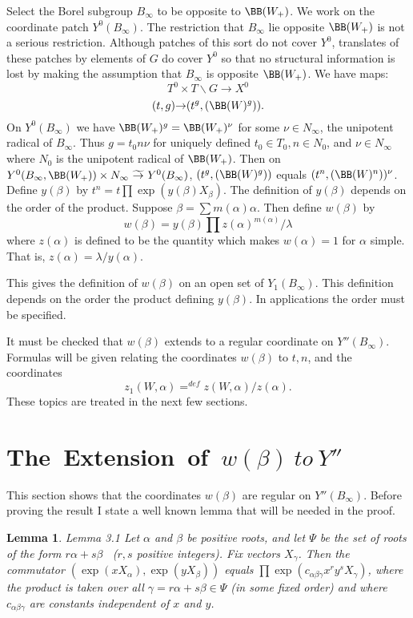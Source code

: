 \documentclass{memo-l}
\newtheorem{lemma}[theorem]{Lemma}
\theoremstyle{definition}
\theoremstyle{remark}
\numberwithin{section}{chapter}
\numberwithin{equation}{chapter}
\begin{document}
   Select the Borel subgroup $B_{{\infty}}$ to be opposite to
${\BB}(W_{+})$.
 We work on the coordinate patch $Y^{0}(B_{{\infty}})$.
 The restriction that $B_{{\infty}}$ lie opposite ${\BB}(W_{+})$ is not a
serious restriction.
 Although patches of this sort do not cover $Y^{0}$, translates of these
patches by elements of $G$ do cover $Y^{0}$ so that no structural information
is lost by making the assumption that $B_{{\infty}}$ is opposite
${\BB}(W_{+})$.
 We have maps:
$$
T^{0} \times T\backslash G {\to} X^{0}
$$
$$
(t,g) {\to} (t^{g},({\BB}(W)^{g})) .
$$
On $Y^{0}(B_{{\infty}})$ we have ${\BB}(W_{+})^{g} =
{\BB}(W_{+})^{{\nu}}$ for some ${\nu} \in N_{{\infty}}$, the unipotent
radical of $B_{{\infty}}$.
 Thus $g=t_{0}n{\nu}$ for uniquely defined $t_{0} \in T_{0}, n \in N_{0}$,
and ${\nu} \in N_{{\infty}}$ where $N_{0}$ is the unipotent radical of
${\BB}(W_{+})$.
 Then on $Y^{0}(B_{{\infty}},{\BB}(W_{+})) \times N_{{\infty}}\
{\widetilde{\to}}\  Y^{0}(B_{{\infty}})$, $(t^{g},({\BB}(W)^{g}))$ equals
$(t^{n},({\BB}(W)^{n}))^{{\nu}}$.
 Define $y({\beta})$ by $t^{n} = t \prod \exp(y({\beta})X_{{\beta}})$.
 The definition of $y({\beta})$ depends on the order of the product.
 Suppose ${\beta} = \sum m({\alpha}){\alpha}$.
 Then define $w({\beta})$ by
$$
w({\beta}) = y({\beta})
\prod z({\alpha})^{m({\alpha})}/{\lambda}
$$
where $z({\alpha})$ is defined to be the quantity which makes $w({\alpha}) = 1$
for ${\alpha}$ simple.
 That is, $z({\alpha}) = {\lambda}/y({\alpha})$.

   This gives the definition of $w({\beta})$ on an open set of
$Y_{1}(B_{{\infty}})$.
 This definition depends on the order the product defining $y({\beta})$.
 In applications the order must be specified.


   It must be checked that $w({\beta})$ extends to a regular coordinate on
$Y''(B_{{\infty}})$.
 Formulas will be given relating the coordinates $w({\beta})$ to $t, n$, and
the coordinates $$z_{1}(W,{\alpha}) =^{def}
z(W,{\alpha})/z({\alpha}).$$
 These topics are treated in the next few sections.

\section{The\ Extension\ of\ $w({\beta})\ to\ Y''$}

   This section shows that the coordinates $w({\beta})$ are regular on
$Y''(B_{{\infty}})$.
 Before proving the result I state a well known lemma that will be needed in
the proof.

\begin{lemma}{Lemma 3.1}   Let ${\alpha}$ and ${\beta}$ be positive roots, and
let $\Psi$
 be the set of roots of the form $r{\alpha} + s{\beta}$ \ ($r,s$ positive integers).
  Fix vectors $X_{{\gamma}}$.
 Then the commutator $(\exp(xX_{{\alpha}}),\exp(yX_{{\beta}}))$ equals
$\prod \exp(c_{{\alpha}{\beta}{\gamma}}x^{r}y^{s}X_{{\gamma}})$, where the
product is taken over all ${\gamma}=r{\alpha}+s{\beta} \in \Psi$
(in some fixed order) and where $c_{{\alpha}{\beta}{\gamma}}$ are constants
independent of $x$ and $y$.
\end{lemma}
\end{document}
